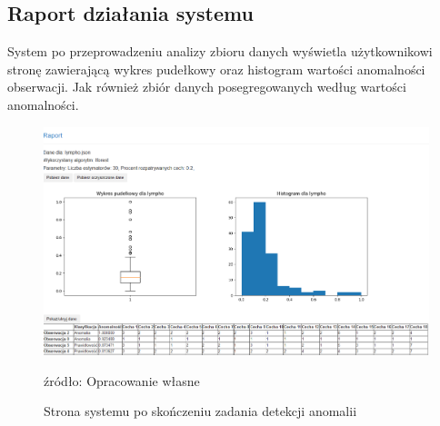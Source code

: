 \subsection{Raport działania systemu }
System po przeprowadzeniu analizy zbioru danych wyświetla użytkownikowi stronę zawierającą wykres pudełkowy oraz histogram wartości anomalności obserwacji. Jak również zbiór danych posegregowanych według wartości anomalności.
\begin{figure}
  \centering
  \includegraphics[width = \textwidth]{chapters/projekt/images/Screenshot_2021-01-29 Raport(3).png}
  \caption{Strona systemu po skończeniu zadania detekcji anomalii}
  \footnotesize{źródło: Opracowanie własne}
  \label{fig:label}
 \end{figure}
